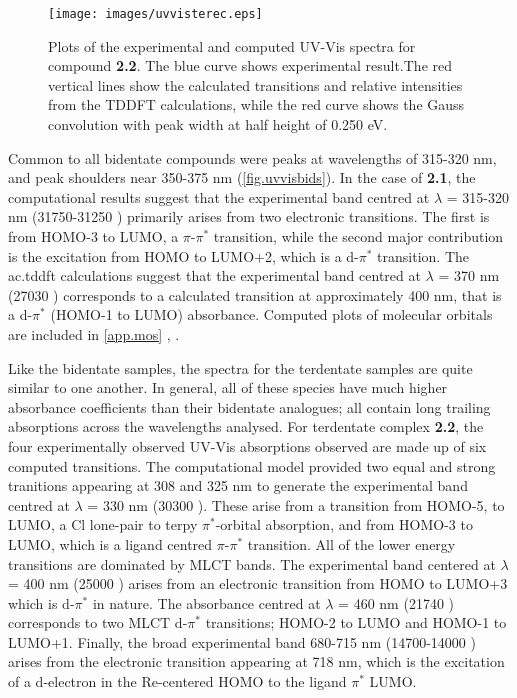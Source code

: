 \begin{figure}[!htb]
 \centering
  \texttt{[image: images/uvvisterec.eps]}
 \caption[Plots of the experimental and computed UV-Vis spectra for compound \textbf{2.2}]{Plots of the experimental and computed UV-Vis spectra for compound \textbf{2.2}.  The blue curve shows experimental result.The red vertical lines show the calculated transitions and relative intensities from the TDDFT calculations, while the red curve shows the Gauss convolution with peak width at half height of 0.250 eV.}
 \label{fig.uvvisterec}
\end{figure}

Common to all bidentate compounds were peaks at wavelengths of 315-320 nm, and peak shoulders near 350-375 nm (\autoref{fig.uvvisbids}). In the case of \textbf{2.1}, the computational results suggest that the experimental band centred at $\lambda$ = 315-320 nm (31750-31250 ) primarily arises from two electronic transitions. The first is from HOMO-3 to LUMO, a $\pi$-$\pi^\ast$ transition, while the second major contribution is the excitation from HOMO to LUMO+2, which is a d-$\pi^\ast$ transition. The \gls{ac.tddft} calculations suggest that the experimental band centred at $\lambda$ = 370 nm (27030 ) corresponds to a calculated transition at approximately 400 nm, that is a d-$\pi^\ast$ (HOMO-1 to LUMO) absorbance. Computed plots of molecular orbitals are included in \autoref{app.mos} , .

Like the bidentate samples, the spectra for the terdentate samples are quite similar to one another. In general, all of these species have much higher absorbance coefficients than their bidentate analogues; all contain long trailing absorptions across the wavelengths analysed. For terdentate complex \textbf{2.2}, the four experimentally observed UV-Vis absorptions observed are made up of six computed transitions. The computational model provided two equal and strong tranitions appearing at 308 and 325 nm to generate the experimental band centred at $\lambda$ = 330 nm (30300 ). These arise from a transition from HOMO-5, to LUMO, a Cl lone-pair to terpy $\pi^\ast$-orbital absorption, and from HOMO-3 to LUMO, which is a ligand centred $\pi$-$\pi^\ast$ transition. All of the lower energy transitions are dominated by MLCT bands. The experimental band centered at $\lambda$ = 400 nm (25000 ) arises from an electronic transition from HOMO to LUMO+3 which is d-$\pi^\ast$ in nature. The absorbance centred at $\lambda$ = 460 nm (21740 ) corresponds to two MLCT d-$\pi^\ast$ transitions; HOMO-2 to LUMO and HOMO-1 to LUMO+1. Finally, the broad experimental band 680-715 nm (14700-14000 ) arises from the electronic transition appearing at 718 nm, which is the excitation of a d-electron in the Re-centered HOMO to the ligand $\pi^\ast$ LUMO.

